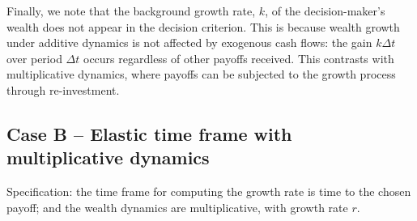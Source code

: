 \documentclass[11pt]{article}
\newcommand{\be}{\begin{equation}}
\newcommand{\ee}{\end{equation}}
\newcommand{\Dt}{\Delta t}
\newcommand{\Dx}{\Delta x}
\newcommand{\Epsilon}{\mathcal{E}}
\numberwithin{equation}{section}
\begin{document}
%
%
%
%

Finally, we note that the background growth rate, $k$, of the decision-maker's wealth does not appear in the decision criterion. This is because wealth growth under additive dynamics is not affected by exogenous cash flows: the gain $k\Dt$ over period $\Dt$ occurs regardless of other payoffs received. This contrasts with multiplicative dynamics, where payoffs can be subjected to the growth process through re-investment.

\subsection{Case B -- Elastic time frame with multiplicative dynamics}\label{sec:case_B}

Specification: the time frame for computing the growth rate is time to the chosen payoff; and the wealth dynamics are multiplicative, with growth rate $r$.
\end{document}

